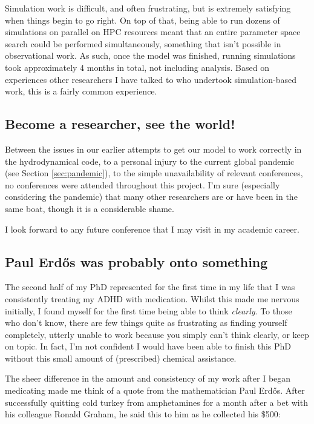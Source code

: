 Simulation work is difficult, and often frustrating, but is extremely satisfying when things begin to go right.
On top of that, being able to run dozens of simulations on parallel on HPC resources meant that an entire parameter space search could be performed simultaneously, something that isn't possible in observational work.
As such, once the model was finished, running simulations took approximately 4 months in total, not including analysis.
Based on experiences other researchers I have talked to who undertook simulation-based work, this is a fairly common experience.

\subsection{Become a researcher, see the world!}

Between the issues in our earlier attempts to get our model to work correctly in the \mg{} hydrodynamical code, to a personal injury to the current global pandemic
(see Section \ref{sec:pandemic}), to the simple unavailability of relevant conferences, no conferences were attended throughout this project.
I'm sure (especially considering the pandemic) that many other researchers are or have been in the same boat, though it is a considerable shame.

I look forward to any future conference that I may visit in my academic career.

\subsection{Paul Erd\H{o}s was probably onto something}

The second half of my PhD represented for the first time in my life that I was consistently treating my ADHD with medication.
Whilst this made me nervous initially, I found myself for the first time being able to think \emph{clearly}.
To those who don't know, there are few things quite as frustrating as finding yourself completely, utterly unable to work because you simply can't think clearly, or keep on topic.
In fact, I'm not confident I would have been able to finish this PhD without this small amount of (prescribed) chemical assistance.

The sheer difference in the amount and consistency of my work after I began medicating made me think of a quote from the mathematician Paul Erd\H{o}s.
After successfully quitting cold turkey from amphetamines for a month after a bet with his colleague Ronald Graham, he said this to him as he collected his \$500:


